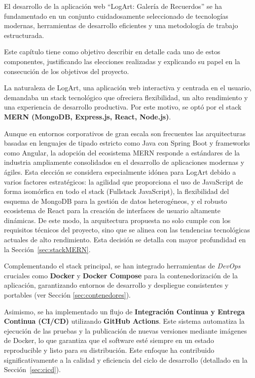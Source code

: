 El desarrollo de la aplicación web ``LogArt: Galería de Recuerdos'' se ha fundamentado en un conjunto cuidadosamente seleccionado de tecnologías modernas, herramientas de desarrollo eficientes y una metodología de trabajo estructurada. 

Este capítulo tiene como objetivo describir en detalle cada uno de estos componentes, justificando las elecciones realizadas y explicando su papel en la consecución de los objetivos del proyecto.

La naturaleza de LogArt, una aplicación web interactiva y centrada en el usuario, demandaba un stack tecnológico que ofreciera flexibilidad, un alto rendimiento y una experiencia de desarrollo productiva. Por este motivo, se optó por el stack \textbf{MERN (MongoDB, Express.js, React, Node.js)}. 

Aunque en entornos corporativos de gran escala son frecuentes las arquitecturas basadas en lenguajes de tipado estricto como Java con Spring Boot y frameworks como Angular, la adopción del ecosistema MERN responde a estándares de la industria ampliamente consolidados en el desarrollo de aplicaciones modernas y ágiles. Esta elección se considera especialmente idónea para LogArt debido a varios factores estratégicos: la agilidad que proporciona el uso de JavaScript de forma isomórfica en todo el stack (Fullstack JavaScript), la flexibilidad del esquema de MongoDB para la gestión de datos heterogéneos, y el robusto ecosistema de React para la creación de interfaces de usuario altamente dinámicas. De este modo, la arquitectura propuesta no solo cumple con los requisitos técnicos del proyecto, sino que se alinea con las tendencias tecnológicas actuales de alto rendimiento. Esta decisión se detalla con mayor profundidad en la Sección~\ref{sec:stackMERN}.

Complementando el stack principal, se han integrado herramientas de \textit{DevOps} cruciales como \textbf{Docker} y \textbf{Docker Compose} para la contenedorización de la aplicación, garantizando entornos de desarrollo y despliegue consistentes y portables (ver Sección \ref{sec:contenedores}).


Asimismo, se ha implementado un flujo de \textbf{Integración Continua y Entrega Continua (CI/CD)} utilizando \textbf{GitHub Actions}. Este sistema automatiza la ejecución de las pruebas y la publicación de nuevas versiones mediante imágenes de Docker, lo que garantiza que el software esté siempre en un estado reproducible y listo para su distribución. Este enfoque ha contribuido significativamente a la calidad y eficiencia del ciclo de desarrollo (detallado en la Sección~\ref{sec:cicd}).

